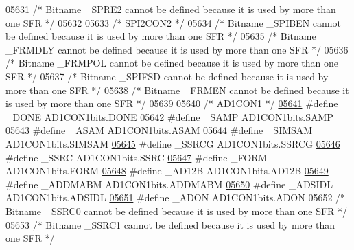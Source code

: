 \begin{DoxyCode}
05631 \textcolor{comment}{/* Bitname \_SPRE2 cannot be defined because it is used by more than one SFR */}
05632 
05633 \textcolor{comment}{/* SPI2CON2 */}
05634 \textcolor{comment}{/* Bitname \_SPIBEN cannot be defined because it is used by more than one SFR */}
05635 \textcolor{comment}{/* Bitname \_FRMDLY cannot be defined because it is used by more than one SFR */}
05636 \textcolor{comment}{/* Bitname \_FRMPOL cannot be defined because it is used by more than one SFR */}
05637 \textcolor{comment}{/* Bitname \_SPIFSD cannot be defined because it is used by more than one SFR */}
05638 \textcolor{comment}{/* Bitname \_FRMEN cannot be defined because it is used by more than one SFR */}
05639 
05640 \textcolor{comment}{/* AD1CON1 */}
\hypertarget{a00015_source_l05641}{}\hyperlink{a00015_a59027a8be1cbf4071522f0b3defff671}{05641} \textcolor{preprocessor}{#define \_DONE AD1CON1bits.DONE}
\hypertarget{a00015_source_l05642}{}\hyperlink{a00015_ace6b95b2efa8b10bc26d99ce74af8d43}{05642} \textcolor{preprocessor}{#define \_SAMP AD1CON1bits.SAMP}
\hypertarget{a00015_source_l05643}{}\hyperlink{a00015_a03bf5daffda68d7323469f42b3549f8d}{05643} \textcolor{preprocessor}{#define \_ASAM AD1CON1bits.ASAM}
\hypertarget{a00015_source_l05644}{}\hyperlink{a00015_ad30462ca02f3365802b0bfaf9ce984c6}{05644} \textcolor{preprocessor}{#define \_SIMSAM AD1CON1bits.SIMSAM}
\hypertarget{a00015_source_l05645}{}\hyperlink{a00015_adfe4c9e45983da35553d07b0b20197eb}{05645} \textcolor{preprocessor}{#define \_SSRCG AD1CON1bits.SSRCG}
\hypertarget{a00015_source_l05646}{}\hyperlink{a00015_a76852fd39427b719ac2bcd6d6ebdabe7}{05646} \textcolor{preprocessor}{#define \_SSRC AD1CON1bits.SSRC}
\hypertarget{a00015_source_l05647}{}\hyperlink{a00015_af84c42ef6f774748aa36923b7cf5ec6d}{05647} \textcolor{preprocessor}{#define \_FORM AD1CON1bits.FORM}
\hypertarget{a00015_source_l05648}{}\hyperlink{a00015_a31a937a168c877dfe17991a24677c110}{05648} \textcolor{preprocessor}{#define \_AD12B AD1CON1bits.AD12B}
\hypertarget{a00015_source_l05649}{}\hyperlink{a00015_aceb6b0e2b09a44b291ffdb11d160339c}{05649} \textcolor{preprocessor}{#define \_ADDMABM AD1CON1bits.ADDMABM}
\hypertarget{a00015_source_l05650}{}\hyperlink{a00015_a869498999d8135f2a76bd330a6f101fa}{05650} \textcolor{preprocessor}{#define \_ADSIDL AD1CON1bits.ADSIDL}
\hypertarget{a00015_source_l05651}{}\hyperlink{a00015_acc48d0a445aeca7183e433b8be518d27}{05651} \textcolor{preprocessor}{#define \_ADON AD1CON1bits.ADON}
05652 \textcolor{comment}{/* Bitname \_SSRC0 cannot be defined because it is used by more than one SFR */}
05653 \textcolor{comment}{/* Bitname \_SSRC1 cannot be defined because it is used by more than one SFR */}

\end{DoxyCode}
